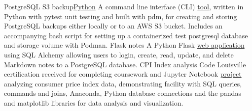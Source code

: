 \datedsubsection{}
{PostgreSQL S3 backup}{\href{https://github.com/JacobArchambault?tab=repositories&q=&type=&language=python&sort=}{Python}}
{A command line interface (CLI) \href{https://github.com/JacobArchambault/pgbackup}{tool}, written in Python with pytest unit testing and built with pdm, for creating and storing PostgreSQL backups either locally or to an AWS S3 bucket. Includes an accompanying bash script for setting up a containerized test postgresql database and storage volume with Podman.}
\datedsubsectionnarrow{}
{Flask notes}{}
{A Python Flask \href{https://github.com/JacobArchambault/pgbackup}{ web application} using SQL Alchemy allowing users to login, create, read, update, and delete Markdown notes to a PostgreSQL database.}
\datedsubsectionnarrow{}
{CPI Index analysis}{}
{Code Louisville certification received for completing coursework and Jupyter Notebook \href{https://github.com/jacobarchambault/cpi-python}{project} analyzing consumer price index data, demonstrating facility with SQL queries, commands and joins, 
	Anaconda, Python database connections and the pandas and matplotlib libraries for data analysis and visualization.}